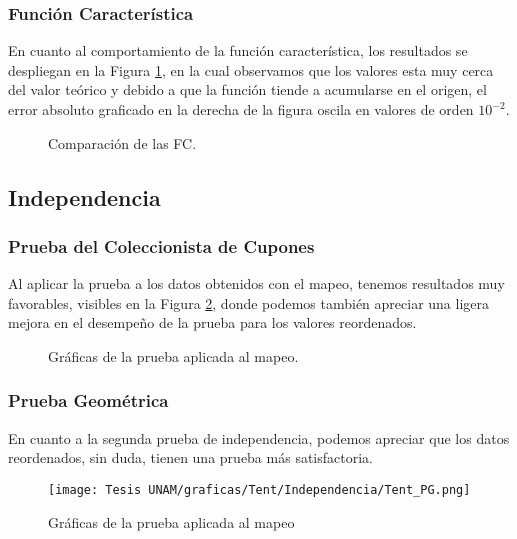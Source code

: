 \documentclass[../Main.tex]{subfiles}
\begin{document}
\subsubsection{Función Característica}
En cuanto al comportamiento de la función característica, los resultados se despliegan en la Figura \ref{fig:FC_tent}, en la cual observamos que los valores esta muy cerca del valor teórico y debido a que la función tiende a acumularse en el origen, el error absoluto graficado en la derecha de la figura oscila en valores de orden $10^{-2}$.
\begin{figure}[h!]
\hfill
{}
\hfill
{}
\hfill
\caption{Comparación de las FC.}
\label{fig:FC_tent}
\end{figure}

\subsection{Independencia}
\subsubsection{Prueba del Coleccionista de Cupones}

Al aplicar la prueba a los datos obtenidos con el mapeo, tenemos resultados muy favorables, visibles en la Figura \ref{fig:PCC_tent}, donde podemos también apreciar una ligera mejora en el desempeño de la prueba para los valores reordenados. 
\begin{figure}[h!]
\hfill
{}
\hfill
{}
\hfill
\caption{Gráficas de la prueba aplicada al mapeo.}
\label{fig:PCC_tent}
   \end{figure}
\subsubsection{Prueba Geométrica}
En cuanto a la segunda prueba de independencia, podemos apreciar que los datos reordenados, sin duda, tienen una prueba más satisfactoria. 
\begin{figure}[h!]
    \centering
    \texttt{[image: Tesis UNAM/graficas/Tent/Independencia/Tent\_PG.png]}
    \caption{Gráficas de la prueba aplicada al mapeo}
    \label{fig:PG_tent}
\end{figure} 
\end{document}

